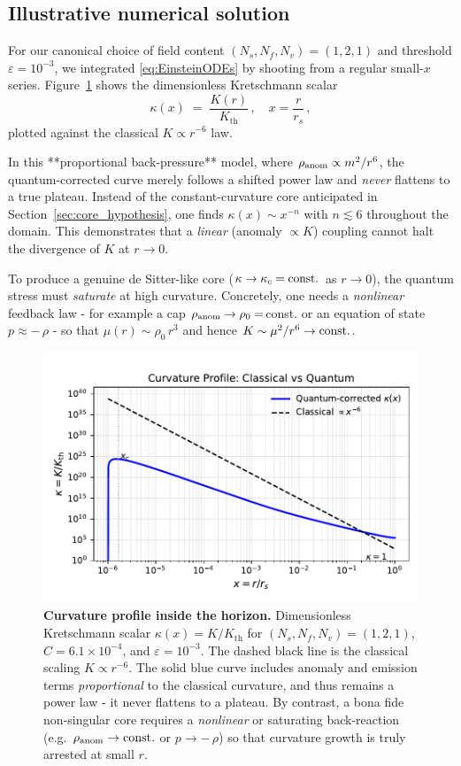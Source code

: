 \subsection{Illustrative numerical solution}
\label{sec:numeric}

For our canonical choice of field content
\((N_s,N_f,N_v)=(1,2,1)\) and threshold 
\(\varepsilon=10^{-3}\), we integrated 
\eqref{eq:EinsteinODEs} by shooting from a regular 
small-\(x\) series. Figure~\ref{fig:Kprofile} shows the 
dimensionless Kretschmann scalar
\[
  \kappa(x)\;=\;\frac{K(r)}{K_{\mathrm{th}}}\,,
  \quad x=\frac{r}{r_s}\,,
\]
plotted against the classical \(K\propto r^{-6}\) law.  

In this **proportional back-pressure** model, where
\(\rho_{\rm anom}\propto m^2/r^6\), the quantum-corrected
curve merely follows a shifted power law and
\emph{never} flattens to a true plateau.  Instead of 
the constant-curvature core anticipated in
Section~\ref{sec:core_hypothesis}, one finds
\(\kappa(x)\sim x^{-n}\) with \(n\lesssim6\) throughout
the domain.  This demonstrates that a \emph{linear}
(anomaly \(\propto K\)) coupling cannot halt the divergence
of \(K\) at \(r\to0\).

To produce a genuine de Sitter-like core
(\(\kappa\to\kappa_c={\rm const.}\) as \(r\to0\)),
the quantum stress must \emph{saturate} at high curvature.
Concretely, one needs a \emph{nonlinear} feedback law
- for example a cap \(\rho_{\rm anom}\to\rho_0=\)const.
or an equation of state \(p\approx-\,\rho\) - so that
\(\mu(r)\sim\rho_0\,r^3\) and hence
\(K\sim\mu^2/r^6\to{\rm const.}\).

\begin{figure}[t]
  \centering
  \includegraphics[width=0.68\linewidth]{figs/Kprofile_combined.pdf}
  \caption{\textbf{Curvature profile inside the horizon.}
    Dimensionless Kretschmann scalar
    \(\kappa(x)=K/K_{\mathrm{th}}\) for 
    \((N_s,N_f,N_v)=(1,2,1)\), \(C=6.1\times10^{-4}\),
    and \(\varepsilon=10^{-3}\).  The dashed black line
    is the classical scaling \(K\propto r^{-6}\).  The
    solid blue curve includes anomaly and emission
    terms \emph{proportional} to the classical curvature,
    and thus remains a power law - it never flattens to
    a plateau.  By contrast, a bona fide non‐singular core
    requires a \emph{nonlinear} or saturating back-reaction
    (e.g.\ \(\rho_{\rm anom}\to{\rm const.}\) or
    \(p\to-\,\rho\)) so that curvature growth is truly
    arrested at small \(r\).}
  \label{fig:Kprofile}
\end{figure}

